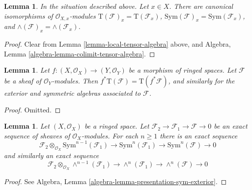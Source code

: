 \documentclass{stacks-project}
\theoremstyle{plain}
\newtheorem{lemma}[subsection]{Lemma}
\theoremstyle{definition}
\theoremstyle{remark}
\numberwithin{equation}{subsection}
\begin{document}
\begin{lemma}
\label{lemma-stalk-tensor-algebra}
In the situation described above. Let $x \in X$.
There are canonical isomorphisms of $\mathcal{O}_{X, x}$-modules
$\text{T}(\mathcal{F})_x = \text{T}(\mathcal{F}_x)$,
$\text{Sym}(\mathcal{F})_x = \text{Sym}(\mathcal{F}_x)$, and
$\wedge(\mathcal{F})_x = \wedge(\mathcal{F}_x)$.
\end{lemma}

\begin{proof}
Clear from Lemma \ref{lemma-local-tensor-algebra} above, and
Algebra, Lemma \ref{algebra-lemma-colimit-tensor-algebra}.
\end{proof}

\begin{lemma}
\label{lemma-pullback-tensor-algebra}
Let $f : (X, \mathcal{O}_X) \to (Y, \mathcal{O}_Y)$ be a morphism of
ringed spaces. Let $\mathcal{F}$ be a sheaf of $\mathcal{O}_Y$-modules.
Then $f^*\text{T}(\mathcal{F}) = \text{T}(f^*\mathcal{F})$,
and similarly for the exterior and symmetric algebras associated
to $\mathcal{F}$.
\end{lemma}

\begin{proof}
Omitted.
\end{proof}

\begin{lemma}
\label{lemma-presentation-sym-exterior}
Let $(X, \mathcal{O}_X)$ be a ringed space.
Let $\mathcal{F}_2 \to \mathcal{F}_1 \to \mathcal{F} \to 0$
be an exact sequence of sheaves of $\mathcal{O}_X$-modules.
For each $n \geq 1$ there is an exact sequence
$$
\mathcal{F}_2 \otimes_{\mathcal{O}_X} \text{Sym}^{n - 1}(\mathcal{F}_1)
\to
\text{Sym}^n(\mathcal{F}_1)
\to
\text{Sym}^n(\mathcal{F})
\to
0
$$
and similarly an exact sequence
$$
\mathcal{F}_2 \otimes_{\mathcal{O}_X} \wedge^{n - 1}(\mathcal{F}_1)
\to
\wedge^n(\mathcal{F}_1)
\to
\wedge^n(\mathcal{F})
\to
0
$$
\end{lemma}

\begin{proof}
See Algebra, Lemma \ref{algebra-lemma-presentation-sym-exterior}.
\end{proof}
\end{document}

